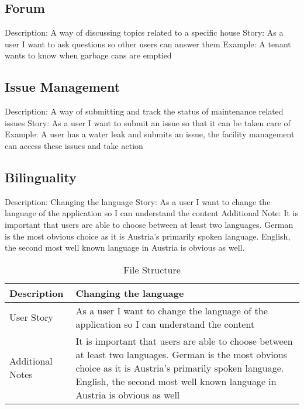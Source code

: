 \subsection{Forum}
Description: A way of discussing topics related to a specific house \newline
Story: As a user I want to ask questions so other users can answer them \newline 
Example: A tenant wants to know when garbage cans are emptied

\subsection{Issue Management}
Description: A way of submitting and track the status of maintenance related issues \newline
Story: As a user I want to submit an issue so that it can be taken care of \newline
Example: A user has a water leak and submits an issue, the facility management can access these issues and take action

\subsection{Bilinguality}
Description: Changing the language \newline
Story: As a user I want to change the language of the application so I can understand the content \newline
Additional Note: It is important that users are able to choose between at least two languages. German is the most obvious choice as it is Austria's primarily spoken language. English, the second most well known language in Austria is obvious as well.

\begin{table}
  \begin{tabularx}{\linewidth}{l|X}
     Description & Changing the language \\
     \hline
     User Story & As a user I want to change the language of the application so I can understand the content \\
     \hline
     Additional Notes & It is important that users are able to choose between at least two languages. German is the most obvious choice as it is Austria's primarily spoken language. English, the second most well known language in Austria is obvious as well 
  \end{tabularx}
  \caption{File Structure}
  \label{table:filestructure}
\end{table}

